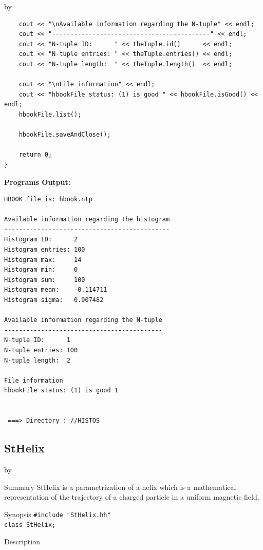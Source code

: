 \documentclass[twoside]{article}
\newcommand{\entrylabel}[1]{\mbox{\textbf{{#1}}}\hfil}%
\newenvironment{entry}
{\begin{list}{}%
    {\renewcommand{\makelabel}{\entrylabel}%
     \setlength{\labelwidth}{90pt}%
     \setlength{\leftmargin}{\labelwidth}
     \advance\leftmargin by \labelsep%
      }%
    }%
  {\end{list}}
\newcommand{\Entrylabel}[1]%
{\raisebox{0pt}[1ex][0pt]{\makebox[\labelwidth][l]%
    {\parbox[t]{\labelwidth}{\hspace{0pt}\textbf{{#1}}}}}}
\newenvironment{Entry}%
{\renewcommand{\entrylabel}{\Entrylabel}\begin{entry}}%
  {\end{entry}}
\begin{document}
\begin{description}
\begin{Entry}
{\begin{verbatim}
    cout << "\nAvailable information regarding the N-tuple" << endl;
    cout << "-------------------------------------------" << endl;
    cout << "N-tuple ID:      " << theTuple.id()      << endl;
    cout << "N-tuple entries: " << theTuple.entries() << endl;
    cout << "N-tuple length:  " << theTuple.length()  << endl;

    cout << "\nFile information" << endl;
    cout << "hbookFile status: (1) is good " << hbookFile.isGood() << endl;
    hbookFile.list();
    
    hbookFile.saveAndClose();

    return 0;
}
\end{verbatim}
}%
{\bf Programs Output:}
{\footnotesize
\begin{verbatim}
HBOOK file is: hbook.ntp

Available information regarding the histogram
---------------------------------------------
Histogram ID:      2
Histogram entries: 100
Histogram max:     14
Histogram min:     0
Histogram sum:     100
Histogram mean:    -0.114711
Histogram sigma:   0.907482

Available information regarding the N-tuple
-------------------------------------------
N-tuple ID:      1
N-tuple entries: 100
N-tuple length:  2

File information
hbookFile status: (1) is good 1


 ===> Directory : //HISTOS
\end{verbatim}
} %
\end{Entry}

\clearpage
  
  
%
%
\subsection{StHelix } \label{StHelix}
\begin{Entry}
\item[Summary]
    StHelix is a parametrization of a helix which is a mathematical
    representation of the trajectory of a charged particle in a
    uniform magnetic field.

\item[Synopsis]
    \verb+#include "StHelix.hh"+\\
    \verb+class StHelix;+
    
    
\item[Description]   
    

\end{Entry}
\end{description}
\end{document}
